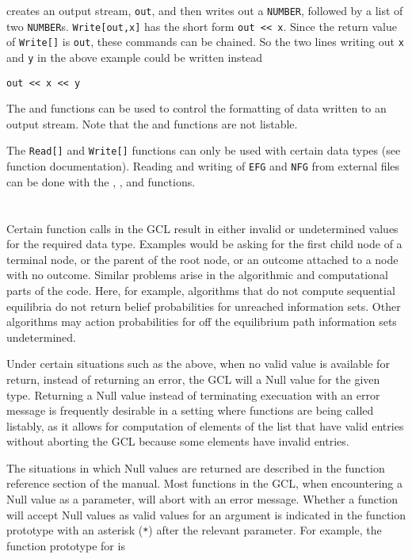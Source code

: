 \noindent
creates an output stream, \verb+out+, and then writes out a
\verb+NUMBER+, followed by a list of two \verb+NUMBER+s.
\verb+Write[out,x]+ has the short form \verb+out << x+.  Since the
return value of \verb+Write[]+ is \verb+out+, these commands can be
chained.  So the two lines writing out \verb+x+ and \verb+y+ in the
above example could be written instead

\begin{verbatim}
out << x << y
\end{verbatim}

The  and  functions can be used to
control the formatting of data written to an output stream.  Note that
the  and  functions are not listable.

The \verb+Read[]+ and \verb+Write[]+ functions can only be used with
certain data types (see function documentation).  Reading and writing
of \verb+EFG+ and \verb+NFG+ from external files can be done with the
, ,  and
 functions.

\section{}

Certain function calls in the GCL result in either invalid or
undetermined values for the required data type. Examples would be
asking for the first child node of a terminal node, or the parent of
the root node, or an outcome attached to a node with no outcome.
Similar problems arise in the algorithmic and computational parts of
the code.  Here, for example, algorithms that do not compute
sequential equilibria do not return belief probabilities for unreached
information sets.  Other algorithms may action probabilities for off
the equilibrium path information sets undetermined.  

Under certain situations such as the above, when no valid value is
available for return, instead of returning an error, the GCL will
a Null value for the given type.  Returning a Null value instead of
terminating execuation with an error message is frequently desirable
in a setting where functions are being called listably, as it allows
for computation of elements of the list that have valid entries
without aborting the GCL because some elements have invalid entries.  

The situations in which Null values are returned are described in the
function reference section of the manual.  Most functions in the GCL,
when encountering a Null value as a parameter, will abort with an
error message.  Whether a function will accept Null values as valid
values for an argument is indicated in the function prototype with an
asterisk (\verb+*+) after the relevant parameter.  For example, the
function prototype for  is

